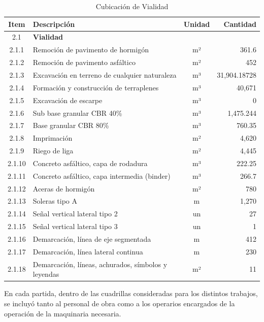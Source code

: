 \documentclass{article} %
\begin{document}
\begin{table}[h!]
    \centering
    \begin{tabular}{|c|l|c|r|}
    \hline
    \textbf{Item} & \textbf{Descripción} & \textbf{Unidad} & \textbf{Cantidad} \\ \hline
    2.1 & \textbf{Vialidad} & & \\ \hline
    2.1.1 & Remoción de pavimento de hormigón & m² & 361.6 \\ \hline
    2.1.2 & Remoción de pavimento asfáltico & m² & 452 \\ \hline
    2.1.3 & Excavación en terreno de cualquier naturaleza & m³ & 31,904.18728 \\ \hline
    2.1.4 & Formación y construcción de terraplenes & m³ & 40,671 \\ \hline
    2.1.5 & Excavación de escarpe & m³ & 0 \\ \hline
    2.1.6 & Sub base granular CBR 40\% & m³ & 1,475.244 \\ \hline
    2.1.7 & Base granular CBR 80\% & m³ & 760.35 \\ \hline
    2.1.8 & Imprimación & m² & 4,620 \\ \hline
    2.1.9 & Riego de liga & m² & 4,445 \\ \hline
    2.1.10 & Concreto asfáltico, capa de rodadura & m³ & 222.25 \\ \hline
    2.1.11 & Concreto asfáltico, capa intermedia (binder) & m³ & 266.7 \\ \hline
    2.1.12 & Aceras de hormigón & m² & 780 \\ \hline
    2.1.13 & Soleras tipo A & m & 1,270 \\ \hline
    2.1.14 & Señal vertical lateral tipo 2 & un & 27 \\ \hline
    2.1.15 & Señal vertical lateral tipo 3 & un & 1 \\ \hline
    2.1.16 & Demarcación, línea de eje segmentada & m & 412 \\ \hline
    2.1.17 & Demarcación, línea lateral continua & m & 230 \\ \hline
    2.1.18 & Demarcación, líneas, achurados, símbolos y leyendas & m² & 11 \\ \hline
    \end{tabular}
    \caption{Cubicación de Vialidad}
\end{table}

En cada partida, dentro de las cuadrillas consideradas para los distintos trabajos, se incluyó tanto al personal de obra como a los operarios encargados de la operación de la maquinaria necesaria.
\end{document}
